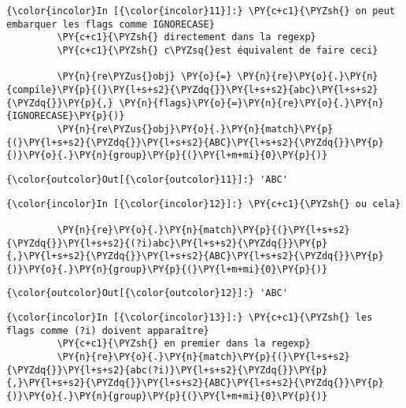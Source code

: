    \begin{Verbatim}[commandchars=\\\{\}]
{\color{incolor}In [{\color{incolor}11}]:} \PY{c+c1}{\PYZsh{} on peut embarquer les flags comme IGNORECASE}
         \PY{c+c1}{\PYZsh{} directement dans la regexp}
         \PY{c+c1}{\PYZsh{} c\PYZsq{}est équivalent de faire ceci}
         
         \PY{n}{re\PYZus{}obj} \PY{o}{=} \PY{n}{re}\PY{o}{.}\PY{n}{compile}\PY{p}{(}\PY{l+s+s2}{\PYZdq{}}\PY{l+s+s2}{abc}\PY{l+s+s2}{\PYZdq{}}\PY{p}{,} \PY{n}{flags}\PY{o}{=}\PY{n}{re}\PY{o}{.}\PY{n}{IGNORECASE}\PY{p}{)}
         \PY{n}{re\PYZus{}obj}\PY{o}{.}\PY{n}{match}\PY{p}{(}\PY{l+s+s2}{\PYZdq{}}\PY{l+s+s2}{ABC}\PY{l+s+s2}{\PYZdq{}}\PY{p}{)}\PY{o}{.}\PY{n}{group}\PY{p}{(}\PY{l+m+mi}{0}\PY{p}{)}
\end{Verbatim}


\begin{Verbatim}[commandchars=\\\{\}]
{\color{outcolor}Out[{\color{outcolor}11}]:} 'ABC'
\end{Verbatim}
            
    \begin{Verbatim}[commandchars=\\\{\}]
{\color{incolor}In [{\color{incolor}12}]:} \PY{c+c1}{\PYZsh{} ou cela}
         
         \PY{n}{re}\PY{o}{.}\PY{n}{match}\PY{p}{(}\PY{l+s+s2}{\PYZdq{}}\PY{l+s+s2}{(?i)abc}\PY{l+s+s2}{\PYZdq{}}\PY{p}{,}\PY{l+s+s2}{\PYZdq{}}\PY{l+s+s2}{ABC}\PY{l+s+s2}{\PYZdq{}}\PY{p}{)}\PY{o}{.}\PY{n}{group}\PY{p}{(}\PY{l+m+mi}{0}\PY{p}{)}
\end{Verbatim}


\begin{Verbatim}[commandchars=\\\{\}]
{\color{outcolor}Out[{\color{outcolor}12}]:} 'ABC'
\end{Verbatim}
            
    \begin{Verbatim}[commandchars=\\\{\}]
{\color{incolor}In [{\color{incolor}13}]:} \PY{c+c1}{\PYZsh{} les flags comme (?i) doivent apparaître}
         \PY{c+c1}{\PYZsh{} en premier dans la regexp}
         \PY{n}{re}\PY{o}{.}\PY{n}{match}\PY{p}{(}\PY{l+s+s2}{\PYZdq{}}\PY{l+s+s2}{abc(?i)}\PY{l+s+s2}{\PYZdq{}}\PY{p}{,}\PY{l+s+s2}{\PYZdq{}}\PY{l+s+s2}{ABC}\PY{l+s+s2}{\PYZdq{}}\PY{p}{)}\PY{o}{.}\PY{n}{group}\PY{p}{(}\PY{l+m+mi}{0}\PY{p}{)}
\end{Verbatim}


